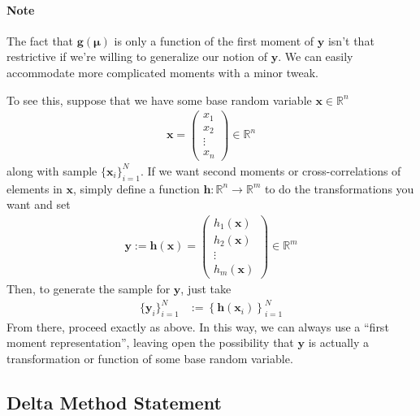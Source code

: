 \documentclass[12pt]{article}
\theoremstyle{plain}
\theoremstyle{definition}
\theoremstyle{remark}
\begin{document}
\paragraph{Note}
The fact that $\boldsymbol{g}(\boldsymbol{\mu})$ is only a function of
the first moment of $\boldsymbol{y}$ isn't that restrictive if we're
willing to generalize our notion of $\boldsymbol{y}$. We can easily
accommodate more complicated moments with a minor tweak.

To see this, suppose that we have some base random variable
$\boldsymbol{x}\in\mathbb{R}^n$
\begin{align*}
  \boldsymbol{x} =
  \begin{pmatrix}
    x_1\\x_2\\\vdots\\x_n
  \end{pmatrix}
  \in \mathbb{R}^n
\end{align*}
along with sample $\{\boldsymbol{x}_i\}_{i=1}^N$. If we want second
moments or cross-correlations of elements in $\boldsymbol{x}$, simply
define a function $\boldsymbol{h}: \mathbb{R}^n \rightarrow
\mathbb{R}^m$ to do the transformations you want and set
\begin{align*}
  \boldsymbol{y}
  :=\boldsymbol{h}(\boldsymbol{x})
  =
  \begin{pmatrix}
    h_1(\boldsymbol{x})\\h_2(\boldsymbol{x})\\\vdots\\h_m(\boldsymbol{x})
  \end{pmatrix}
  \in\mathbb{R}^m
\end{align*}
Then, to generate the sample for $\boldsymbol{y}$, just take
\begin{align*}
  \{\boldsymbol{y}_i\}_{i=1}^N &:=
  \left\{\boldsymbol{h}\left(\boldsymbol{x}_i\right)\right\}_{i=1}^N
\end{align*}
From there, proceed exactly as above. In this way, we can always use a
``first moment representation'', leaving open the possibility that
$\boldsymbol{y}$ is actually a transformation or function of some base
random variable.


\subsection{Delta Method Statement}
\end{document}

